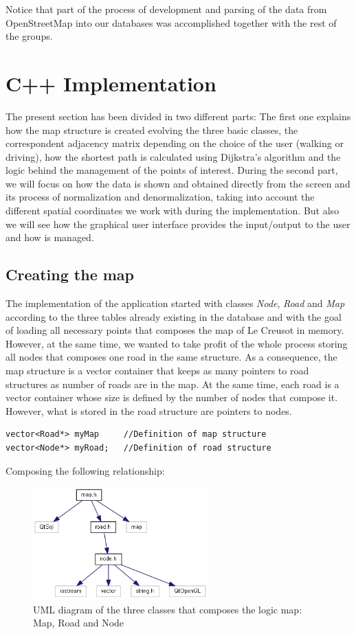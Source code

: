 \documentclass{article}
\begin{document}
Notice that part of the process of development and parsing of the data from OpenStreetMap into our databases was accomplished together with the rest of the groups.

\section{C++ Implementation}

The present section has been divided in two different parts: The first one explains how the map structure is created evolving the three basic classes, the correspondent adjacency matrix depending on the choice of the user (walking or driving), how the shortest path is calculated using Dijkstra's algorithm and the logic behind the management of the points of interest. During the second part, we will focus on how the data is shown and obtained directly from the screen and its process of normalization and denormalization, taking into account the different spatial coordinates we work with during the implementation. But also we will see how the graphical user interface provides the input/output to the user and how is managed.

\subsection{Creating the map}
The implementation of the application started with classes \textit{Node}, \textit{Road} and \textit{Map} according to the three tables already existing in the database and with the goal of loading all necessary points that composes the map of Le Creusot in memory. However, at the same time, we wanted to take profit of the whole process storing all nodes that composes one road in the same structure. As a consequence, the map structure is a vector container that keeps as many pointers to road structures as number of roads are in the map. At the same time, each road is a vector container whose size is defined by the number of nodes that compose it. However, what is stored in the road structure are pointers to nodes.

\begin{lstlisting}
vector<Road*> myMap 	//Definition of map structure
vector<Node*> myRoad;	//Definition of road structure
\end{lstlisting}

Composing the following relationship:

\begin{figure}[h]
\centering
\includegraphics[width=0.6\textwidth]{map.png}
\caption{UML diagram of the three classes that composes the logic map: Map, Road and Node}
\end{figure}
\end{document}
